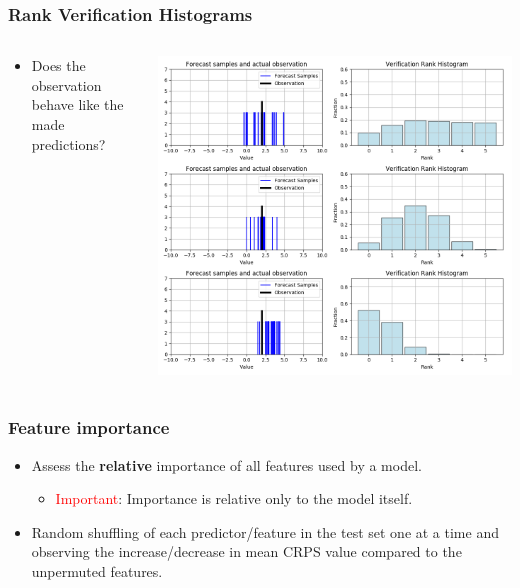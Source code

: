 \documentclass[18pt]{beamer}
\begin{document}
\begin{frame}[t]
  \frametitle{Rank Verification Histograms}
  \begin{columns}
    \begin{column}[b]{0.3\textwidth}
      \begin{itemize}
      \item Does the observation behave like the made predictions?
      \end{itemize}
    \end{column}
    \begin{column}{0.7\textwidth}
      \begin{center}
        \includegraphics[scale=0.3]{images/verification_histogram}
      \end{center}
    \end{column}
  \end{columns}
\end{frame}

\begin{frame}
  \frametitle{Feature importance}
  \begin{itemize}
  \item Assess the \textbf{relative} importance of all features used by a model.
    \begin{itemize}
    \item \textcolor{red}{Important}: Importance is relative only to the model itself.
    \end{itemize}
    \item Random shuffling of each predictor/feature in the test set one at a time and observing the increase/decrease in mean CRPS value compared to the unpermuted features.
  \end{itemize}
\end{frame}
\end{document}
